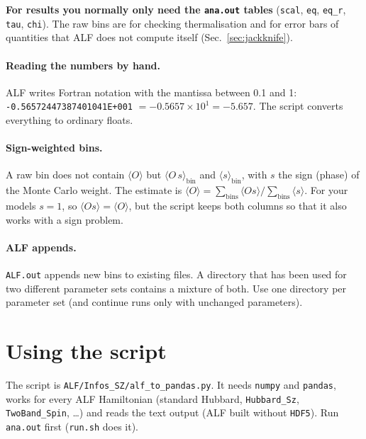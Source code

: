 \documentclass[11pt,a4paper]{article}
\newcommand{\f}[1]{\texttt{#1}}
\begin{document}
\textbf{For results you normally only need the \f{ana.out} tables} (\f{scal}, \f{eq},
\f{eq\_r}, \f{tau}, \f{chi}). The raw bins are for checking thermalisation and for error bars of
quantities that ALF does not compute itself (Sec.~\ref{sec:jackknife}).

\paragraph{Reading the numbers by hand.}
ALF writes Fortran notation with the mantissa between 0.1 and 1:
\f{-0.56572447387401041E+001} $=-0.5657\times10^{1}=-5.657$. The script converts everything to
ordinary floats.

\paragraph{Sign-weighted bins.}
A raw bin does not contain $\langle O\rangle$ but $\langle O\,s\rangle_\text{bin}$ and
$\langle s\rangle_\text{bin}$, with $s$ the sign (phase) of the Monte Carlo weight. The
estimate is $\langle O\rangle=\sum_\text{bins}\langle Os\rangle/\sum_\text{bins}\langle s\rangle$.
For your models $s=1$, so $\langle O s\rangle=\langle O\rangle$, but the script keeps both
columns so that it also works with a sign problem.

\paragraph{ALF appends.}
\f{ALF.out} appends new bins to existing files. A directory that has been used for two
different parameter sets contains a mixture of both. Use one directory per parameter set
(and continue runs only with unchanged parameters).

\section{Using the script}

The script is \f{ALF/Infos\_SZ/alf\_to\_pandas.py}. It needs \f{numpy} and \f{pandas}, works for
every ALF Hamiltonian (standard Hubbard, \f{Hubbard\_Sz}, \f{TwoBand\_Spin}, \dots) and reads
the text output (ALF built without \f{HDF5}). Run \f{ana.out} first (\f{run.sh} does it).
\end{document}
